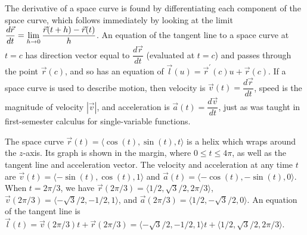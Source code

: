 The derivative of a space curve is found by differentiating each
component of the space curve, which follows immediately by looking at
the limit $\displaystyle\frac{d\vec r}{dt}=\lim_{h\to 0}\frac{\vec r(t+h)-\vec
  r(t)}{h}$. An equation of the tangent line to a space curve at $t=c$
has direction vector equal to $\dfrac{d\vec r}{dt}$ (evaluated at
$t=c$) and passes through the point $\vec r(c)$, and so has an equation of
$\vec l(u) = \vec r^\prime(c)u+\vec r(c)$. If a space curve is used to
describe motion, then velocity is $\vec v(t) = \dfrac{d\vec r}{dt}$,
speed is the magnitude of velocity $|\vec v|$, and acceleration is
$\vec a(t) = \dfrac{d\vec v}{dt}$, just as was taught in first-semester
calculus for single-variable functions.

\begin{example}

%



The space curve {$\vec r(t)=\langle\cos(t),\sin(t),t\rangle$} is a
helix which wraps around the $z$-axis.  Its graph is shown in the
margin, where $0\leq t\leq 4\pi$, as well as the tangent line and
acceleration vector. The velocity and acceleration at any time $t$ are
$\vec v(t) = \langle-\sin(t),\cos(t),1\rangle$ and $\vec a(t) =
\langle-\cos(t),-\sin(t),0\rangle$. When $t=2\pi/3$, we have $\vec
r(2\pi/3) = \langle1/2,\sqrt{3}/2,2\pi/3\rangle$, $\vec v(2\pi/3) =
\langle-\sqrt{3}/2,-1/2,1\rangle$, and $\vec a(2\pi/3) =
\langle1/2,-\sqrt{3}/2,0\rangle$. An equation of the tangent line is
$\vec l(t) = \vec v(2\pi/3)t+ \vec r(2\pi/3)=
\langle-\sqrt{3}/2,-1/2,1\rangle
t+\langle1/2,\sqrt{3}/2,2\pi/3\rangle$.
\end{example}


